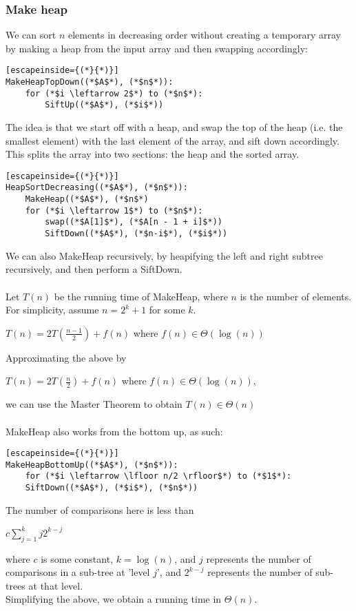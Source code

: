 \documentclass[a4paper]{article}
\begin{document}
\subsubsection{Make heap}
We can sort $n$ elements in decreasing order without creating a temporary array by making a heap from the input array and then swapping accordingly:
\begin{lstlisting}[escapeinside={(*}{*)}]
MakeHeapTopDown((*$A$*), (*$n$*)):
	for (*$i \leftarrow 2$*) to (*$n$*):
		SiftUp((*$A$*), (*$i$*))
\end{lstlisting}
The idea is that we start off with a heap, and swap the top of the heap (i.e. the smallest element) with the last element of the array, and sift down accordingly. This splits the array into two sections: the heap and the sorted array.
\begin{lstlisting}[escapeinside={(*}{*)}]
HeapSortDecreasing((*$A$*), (*$n$*)):
	MakeHeap((*$A$*), (*$n$*)
	for (*$i \leftarrow 1$*) to (*$n$*):
		swap((*$A[1]$*), (*$A[n - 1 + i]$*))
		SiftDown((*$A$*), (*$n-i$*), (*$i$*))
\end{lstlisting}
We can also MakeHeap recursively, by heapifying the left and right subtree recursively, and then perform a SiftDown.\\\\
Let $T(n)$ be the running time of MakeHeap, where $n$ is the number of elements. For simplicity, assume $n=2^k + 1$ for some $k$.
\begin{center}
	$T(n) = 2T(\frac{n-1}{2}) + f(n)$ where $f(n) \in \Theta(\log(n))$\\
\end{center}
Approximating the above by\\
\begin{center}
	$T(n) = 2T(\frac{n}{2}) + f(n)$ where $f(n) \in \Theta(\log(n))$,\\
\end{center}
we can use the Master Theorem to obtain $T(n) \in \Theta(n)$\\ \\
MakeHeap also works from the bottom up, as such:
\begin{lstlisting}[escapeinside={(*}{*)}]
MakeHeapBottomUp((*$A$*), (*$n$*)):
	for (*$i \leftarrow \lfloor n/2 \rfloor$*) to (*$1$*):
	SiftDown((*$A$*), (*$i$*), (*$n$*))
\end{lstlisting}
The number of comparisons here is less than
\begin{center}
	$c\sum\limits_{j=1}^{k}j2^{k-j}$
\end{center}
where $c$ is some constant, $k=\log(n)$, and $j$ represents the number of comparisons in a sub-tree at 'level $j$', and $2^{k-j}$ represents the number of sub-trees at that level.\\
Simplifying the above, we obtain a running time in $\Theta(n)$.
\end{document}
